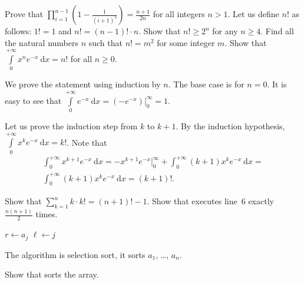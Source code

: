 \begin{chapterendexercises}
        Prove that
        $\prod_{i = 1}^{n - 1} \left(1 - \frac{1}{(i + 1)^2} \right) =
        \frac{n + 1}{2n}$ for all integers $n > 1$.
    \exercise Let us define $n!$ as follows: $1! = 1$ and
      $n! = (n - 1)! \cdot n$. Show that $n! \ge 2^n$ for any $n \ge 4$.
    \exercise[open] Find all the natural numbers $n$ such that $n! = m^2$ for
      some integer $m$.
    \exercise Show that
      $\int\limits_0^{+\infty} x^n e^{- x} ~ \mathrm{d}x = n!$
      for all $n \ge 0$.
      \begin{solution}
        We prove the statement using induction by $n$. The base case is for $n =
        0$. It is easy to see that $\int\limits_0^{+\infty} e^{-x} ~ \mathrm{d}x
        = (-e^{-x})\big\rvert_0^\infty = 1$.
 
        Let us prove the induction step from $k$ to $k + 1$. By the induction
        hypothesis, $\int\limits_0^{+\infty} x^k e^{- x} ~ \mathrm{d}x = k!$.
        Note that
        \begin{multline*}
          \int_0^{+\infty} x^{k + 1} e^{- x} ~ \mathrm{d}x =
          -x^{k + 1} e^{- x}\big\rvert_0^\infty +
            \int_0^{+\infty} (k + 1) x^k e^{- x} ~ \mathrm{d}x = \\
          \int_0^{+\infty} (k + 1) x^k e^{- x} ~ \mathrm{d}x = (k + 1)!.
        \end{multline*}
      \end{solution}
    \exercise Show that $\sum_{k = 1}^n k \cdot k! = (n + 1)! - 1$.
    \exercise Show that  executes line~6 exactly
      $\frac{n (n + 1)}{2}$ times.
      \begin{algorithm}
        \begin{algorithmic}[1]
                  \State $r \gets a_j$
                  \State $\ell \gets j$
                \EndIf
              \EndFor
            \EndFor
          \EndFunction
        \end{algorithmic}
        \caption{The algorithm is selection sort, it sorts $a_1$, \dots, $a_n$.}
        \label{algorithm:selection-sort}
      \end{algorithm}
    \exercise Show that  sorts the array.
\end{chapterendexercises}
